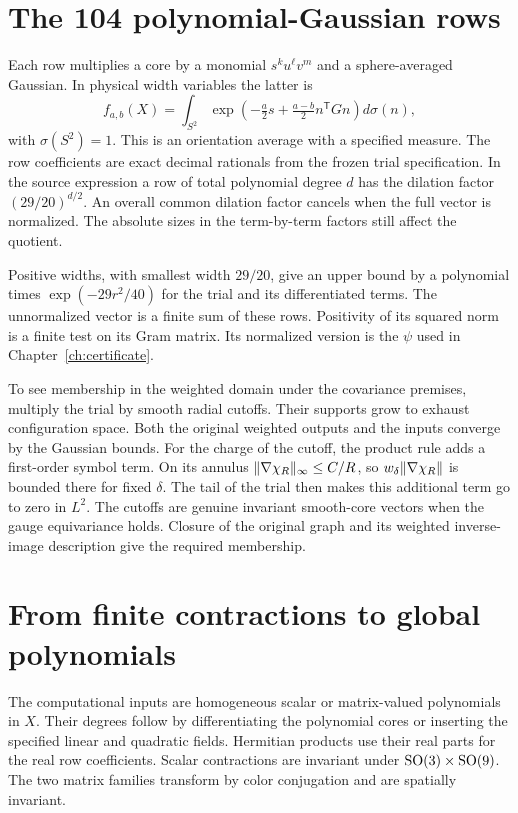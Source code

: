 \section{The 104 polynomial-Gaussian rows}
Each row multiplies a core by a monomial $s^k u^\ell v^m$ and a sphere-averaged Gaussian. In physical width variables the latter is
\[
 f_{a,b}(X)=\int_{S^2}
  \exp\!\left(-\tfrac a2 s+\tfrac{a-b}{2} n^{\mathsf T}G n\right)d\sigma(n),
\]
with $\sigma(S^2)=1$. This is an orientation average with a specified measure. The row coefficients are exact decimal rationals from the frozen trial specification. In the source expression a row of total polynomial degree $d$ has the dilation factor $(29/20)^{d/2}$. An overall common dilation factor cancels when the full vector is normalized. The absolute sizes in the term-by-term factors still affect the quotient.

Positive widths, with smallest width $29/20$, give an upper bound by a polynomial times $\exp(-29r^2/40)$ for the trial and its differentiated terms. The unnormalized vector is a finite sum of these rows. Positivity of its squared norm is a finite test on its Gram matrix. Its normalized version is the $\psi$ used in Chapter~\ref{ch:certificate}.

To see membership in the weighted domain under the covariance premises, multiply the trial by smooth radial cutoffs. Their supports grow to exhaust configuration space. Both the original weighted outputs and the inputs converge by the Gaussian bounds. For the charge of the cutoff, the product rule adds a first-order symbol term. On its annulus $\lVert \nabla\chi_R\rVert_\infty\le C/R$, so $w_\delta\lVert \nabla\chi_R\rVert$ is bounded there for fixed $\delta$. The tail of the trial then makes this additional term go to zero in $L^2$. The cutoffs are genuine invariant smooth-core vectors when the gauge equivariance holds. Closure of the original graph and its weighted inverse-image description give the required membership.


\section{From finite contractions to global polynomials}
The computational inputs are homogeneous scalar or matrix-valued polynomials in $X$. Their degrees follow by differentiating the polynomial cores or inserting the specified linear and quadratic fields. Hermitian products use their real parts for the real row coefficients. Scalar contractions are invariant under $\operatorname{SO}(3)\times\operatorname{SO}(9)$. The two matrix families transform by color conjugation and are spatially invariant.

